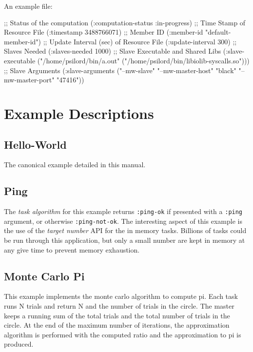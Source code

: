 \documentclass[titlepage,12pt]{book}
\newcommand{\ta}{\textit{task algorithm}\xspace}
\newcommand{\rfile}{\textit{resource file}\xspace}
\newcommand{\keyword}[1]{\texttt{:#1}\xspace}
\begin{document}
An example file:

\begin{lisp}[caption=Contents of a sample \rfile]
;; Status of the computation
(:computation-status :in-progress)
;; Time Stamp of Resource File
(:timestamp 3488766071)
;; Member ID
(:member-id "default-member-id")
;; Update Interval (sec) of Resource File
(:update-interval 300)
;; Slaves Needed
(:slaves-needed 1000)
;; Slave Executable and Shared Libs
(:slave-executable 
   ("/home/psilord/bin/a.out" ("/home/psilord/bin/libiolib-syscalls.so")))
;; Slave Arguments
(:slave-arguments ("--mw-slave" "--mw-master-host" "black" 
                   "--mw-master-port" "47416"))
\end{lisp}


\appendix

\chapter{Example Descriptions}

\section{Hello-World}
The canonical example detailed in this manual.

\section{Ping}
The \ta for this example returns \keyword{ping-ok} if presented with
a \keyword{ping} argument, or otherwise \keyword{ping-not-ok}. The
interesting aspect of this example is the use of the \emph{target
number} API for the in memory tasks. Billions of tasks could be run
through this application, but only a small number are kept in memory
at any give time to prevent memory exhaustion.

\section{Monte Carlo Pi}
This example implements the monte carlo algorithm to compute pi. Each
task runs N trials and return N and the number of trials in the
circle. The master keeps a running sum of the total trials and the
total number of trials in the circle. At the end of the maximum
number of iterations, the approximation algorithm is performed with
the computed ratio and the approximation to pi is produced.
\end{document}

